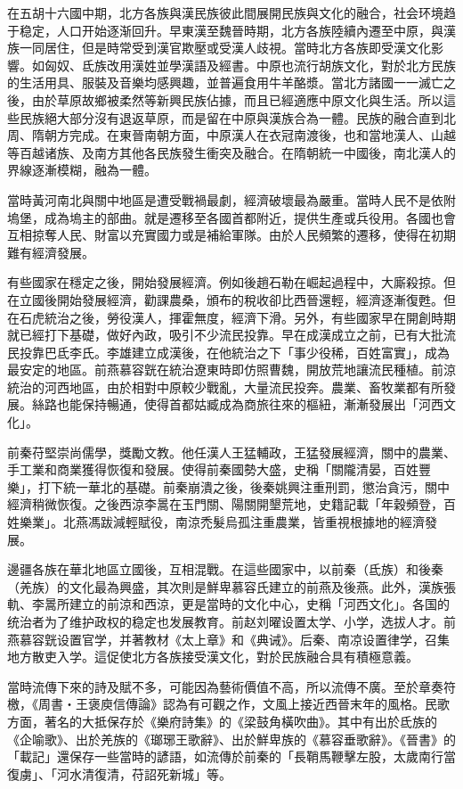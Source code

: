 在五胡十六國中期，北方各族與漢民族彼此間展開民族與文化的融合，社会环境趋于稳定，人口开始逐渐回升。早東漢至魏晉時期，北方各族陸續內遷至中原，與漢族一同居住，但是時常受到漢官欺壓或受漢人歧視。當時北方各族即受漢文化影響。如匈奴、氐族改用漢姓並學漢語及經書。中原也流行胡族文化，對於北方民族的生活用具、服裝及音樂均感興趣，並普遍食用牛羊酪漿。當北方諸國一一滅亡之後，由於草原故鄉被柔然等新興民族佔據，而且已經適應中原文化與生活。所以這些民族絕大部分沒有退返草原，而是留在中原與漢族合為一體。民族的融合直到北周、隋朝方完成。在東晉南朝方面，中原漢人在衣冠南渡後，也和當地漢人、山越等百越诸族、及南方其他各民族發生衝突及融合。在隋朝統一中國後，南北漢人的界線逐漸模糊，融為一體。

當時黃河南北與關中地區是遭受戰禍最劇，經濟破壞最為嚴重。當時人民不是依附塢堡，成為塢主的部曲。就是遷移至各國首都附近，提供生產或兵役用。各國也會互相掠奪人民、財富以充實國力或是補給軍隊。由於人民頻繁的遷移，使得在初期難有經濟發展。

有些國家在穩定之後，開始發展經濟。例如後趙石勒在崛起過程中，大廝殺掠。但在立國後開始發展經濟，勸課農桑，頒布的稅收卻比西晉還輕，經濟逐漸復甦。但在石虎統治之後，勞役漢人，揮霍無度，經濟下滑。另外，有些國家早在開創時期就已經打下基礎，做好內政，吸引不少流民投靠。早在成漢成立之前，已有大批流民投靠巴氐李氏。李雄建立成漢後，在他統治之下「事少役稀，百姓富實」，成為最安定的地區。前燕慕容皝在統治遼東時即仿照曹魏，開放荒地讓流民種植。前涼統治的河西地區，由於相對中原較少戰亂，大量流民投奔。農業、畜牧業都有所發展。絲路也能保持暢通，使得首都姑臧成為商旅往來的樞紐，漸漸發展出「河西文化」。

前秦苻堅崇尚儒學，獎勵文教。他任漢人王猛輔政，王猛發展經濟，關中的農業、手工業和商業獲得恢復和發展。使得前秦國勢大盛，史稱「關隴清晏，百姓豐樂」，打下統一華北的基礎。前秦崩潰之後，後秦姚興注重刑罰，懲治貪污，關中經濟稍微恢復。之後西涼李暠在玉門關、陽關開墾荒地，史籍記載「年穀頻登，百姓樂業」。北燕馮跋減輕賦役，南涼禿髮烏孤注重農業，皆重視根據地的經濟發展。

邊疆各族在華北地區立國後，互相混戰。在這些國家中，以前秦（氐族）和後秦（羌族）的文化最為興盛，其次則是鮮卑慕容氏建立的前燕及後燕。此外，漢族張軌、李暠所建立的前涼和西涼，更是當時的文化中心，史稱「河西文化」。各国的统治者为了维护政权的稳定也发展教育。前赵刘曜设置太学、小学，选拔人才。前燕慕容皝设置官学，并著教材《太上章》和《典诫》。后秦、南凉设置律学，召集地方散吏入学。這促使北方各族接受漢文化，對於民族融合具有積極意義。

當時流傳下來的詩及賦不多，可能因為藝術價值不高，所以流傳不廣。至於章奏符檄，《周書‧王褒庾信傳論》認為有可觀之作，文風上接近西晉末年的風格。民歌方面，著名的大抵保存於《樂府詩集》的《梁鼓角橫吹曲》。其中有出於氐族的《企喻歌》、出於羌族的《瑯琊王歌辭》、出於鮮卑族的《慕容垂歌辭》。《晉書》的「載記」還保存一些當時的諺語，如流傳於前秦的「長鞘馬鞭擊左股，太歲南行當復虜」、「河水清復清，苻詔死新城」等。

